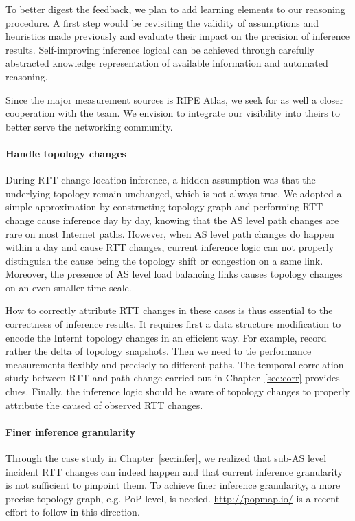To better digest the feedback, we plan to add learning elements to our reasoning procedure. A first step would be revisiting the validity of assumptions and heuristics made previously and evaluate their impact on the precision of inference results. Self-improving inference logical can be achieved through carefully abstracted knowledge representation of available information and automated reasoning.

Since the major measurement sources is RIPE Atlas, we seek for as well a closer cooperation with the team. We envision to integrate our visibility into theirs to better serve the networking community.

\paragraph*{Handle topology changes} During RTT change location inference, a hidden assumption was that the underlying topology remain unchanged, which is not always true. We adopted a simple approximation by constructing topology graph and performing RTT change cause inference day by day, knowing that the AS level path changes are rare on most Internet paths. 
However, when AS level path changes do happen within a day and cause RTT changes, current inference logic can not properly distinguish the cause being the topology shift or congestion on a same link.
Moreover, the presence of AS level load balancing links causes topology changes on an even smaller time scale. 

How to correctly attribute RTT changes in these cases is thus essential to the correctness of inference results.
It requires first a data structure modification to encode the Internt topology changes in an efficient way. For example, record rather the delta of topology snapshots.
Then we need to tie performance measurements flexibly and precisely to different paths. The temporal correlation study between RTT and path change carried out in Chapter~\ref{sec:corr} provides clues.
Finally, the inference logic should be aware of topology changes to properly attribute the caused of observed RTT changes.

\paragraph*{Finer inference granularity} Through the case study in Chapter~\ref{sec:infer}, we realized that sub-AS level incident RTT changes can indeed happen and that current inference granularity is not sufficient to pinpoint them.
To achieve finer inference granularity, a more precise topology graph, e.g. \ac{PoP} level, is needed. \url{http://popmap.io/} is a recent effort to follow in this direction.

